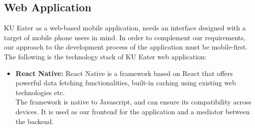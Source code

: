 \subsection{Web Application}
\label{subsection:web-application}
KU Eater as a web-based mobile application, needs an interface designed with a target of mobile phone users in mind.
In order to complement our requirements, our approach to the development process of the application must be mobile-first.
The following is the technology stack of KU Eater web application:

\begin{itemize}[leftmargin=80pt]
    \item \textbf{React Native:} React Native is a framework based on React that offers powerful data fetching functionalities, built-in caching using existing web technologies etc. \\
    The framework is native to Javascript, and can ensure its compatibility across devices. It is used as our frontend for the application and a mediator between the backend.
\end{itemize}